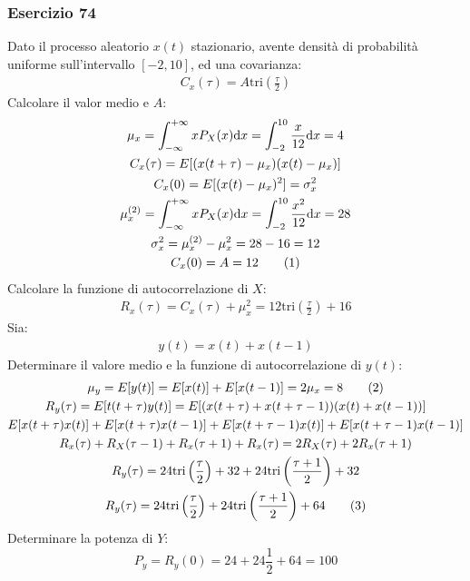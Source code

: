 \documentclass{article}
\newcommand{\df}{\mathrm{d}}
\newcommand{\tageq}{\tag{\stepcounter{equation}\theequation}}
\begin{document}
\subsubsection*{Esercizio 74}

Dato il processo aleatorio $x(t)$ stazionario, avente densità di probabilità uniforme sull'intervallo $[-2,10]$, ed una covarianza:
\begin{gather*}
    C_x(\tau)=A\mathrm{tri}\displaystyle\left(\frac{\tau}{2}\right)
\end{gather*}
Calcolare il valor medio e $A$:
\begin{gather*}
    \mu_x=\displaystyle\int_{-\infty}^{+\infty}xP_X(x)\df x=\int_{-2}^{10}\frac{x}{12}\df x=4\\
    C_x(\tau)=E[(x(t+\tau)-\mu_x)(x(t)-\mu_x)]\\
    C_x(0)=E[(x(t)-\mu_x)^2]=\sigma_x^2\\
    \mu_x^{(2)}=\displaystyle\int_{-\infty}^{+\infty}xP_X(x)\df x=\int_{-2}^{10}\frac{x^2}{12}\df x=28\\
    \sigma_x^2=\mu_x^{(2)}-\mu_x^2=28-16=12\\
    C_x(0)=A=12\tageq
\end{gather*}
Calcolare la funzione di autocorrelazione di $X$:
\begin{gather}
    R_x(\tau)=C_x(\tau)+\mu_x^2=12\mathrm{tri}\displaystyle\left(\frac{\tau}{2}\right)+16
\end{gather}
Sia: 
\begin{gather*}
    y(t)=x(t)+x(t-1)
\end{gather*}
Determinare il valore medio e la funzione di autocorrelazione di $y(t)$:
\begin{gather*}
    \mu_y=E[y(t)]=E[x(t)]+E[x(t-1)]=2\mu_x=8\tageq\\
    R_y(\tau)=E[t(t+\tau)y(t)]=E[(x(t+\tau)+x(t+\tau-1))(x(t)+x(t-1))]\\
    E[x(t+\tau)x(t)]+E[x(t+\tau)x(t-1)]+E[x(t+\tau-1)x(t)]+E[x(t+\tau-1)x(t-1)]\\
    R_x(\tau)+R_X(\tau-1)+R_x(\tau+1)+R_x(\tau)=2R_X(\tau)+2R_x(\tau+1)\\
    R_y(\tau)=24\mathrm{tri}\displaystyle\left(\frac{\tau}{2}\right)+32+24\mathrm{tri}\left(\frac{\tau+1}{2}\right)+32\\
    R_y(\tau)=24\mathrm{tri}\displaystyle\left(\frac{\tau}{2}\right)+24\mathrm{tri}\left(\frac{\tau+1}{2}\right)+64\tageq
\end{gather*}
Determinare la potenza di $Y$:
\begin{equation}
    P_y=R_y(0)=24+24\displaystyle\frac{1}{2}+64=100    
\end{equation}
\end{document}

